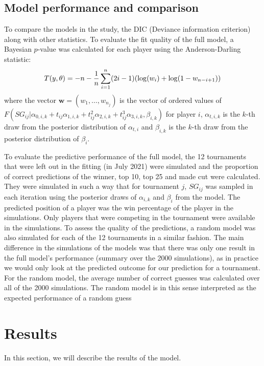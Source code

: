 \documentclass{article}\usepackage[]{graphicx}\usepackage[]{color}
\begin{document}
\subsection{Model performance and comparison}
To compare the models in the study, the DIC (Deviance information criterion) along with other statistics. To evaluate the fit quality of the full model, a Bayesian $p$-value was calculated for each player using the Anderson-Darling statistic:
\begin{align*}
    T(y, \theta) = -n - \frac1n\sum_{i=1}^n(2i-1)\qty(\log(w_i)+\log(1-w_{n-i+1}))
\end{align*}
where the vector $\bm{w} = (w_1,\ldots,w_{n_j})$ is the vector of ordered values of $F(SG_{ij}|\alpha_{0,i, k}+ t_{ij}\alpha_{1,i,k}+t_{ij}^2\alpha_{2,i,k}+t^3_{ij}\alpha_{3,i,k}, \beta_{i,k})$ for player $i$, $\alpha_{t,i,k}$ is the $k$-th draw from the posterior distribution of $\alpha_{t,i}$ and $\beta_{i,k}$ is the $k$-th draw from the posterior distribution of $\beta_i$. 
\medskip\par
To evaluate the predictive performance of the full model, the 12 tournaments that were left out in the fitting (in July 2021) were simulated and the proportion of correct predictions of the winner, top 10, top 25 and made cut were calculated. They were simulated in such a way that for tournament $j$, $SG_{ij}$ was sampled in each iteration using the posterior draws of $\alpha_{i,k}$ and $\beta_{i}$ from the model. The predicted position of a player was the win percentage of the player in the simulations. Only players that were competing in the tournament were available in the simulations. To assess the quality of the predictions, a random model was also simulated for each of the 12 tournaments in a similar fashion. The main difference in the simulations of the models was that there was only one result in the full model's performance (summary over the 2000 simulations), as in practice we would only look at the predicted outcome for our prediction for a tournament. For the random model, the average number of correct guesses was calculated over all of the 2000 simulations. The random model is in this sense interpreted as the expected performance of a random guess

\section{Results}
In this section, we will describe the results of the model.
\end{document}
